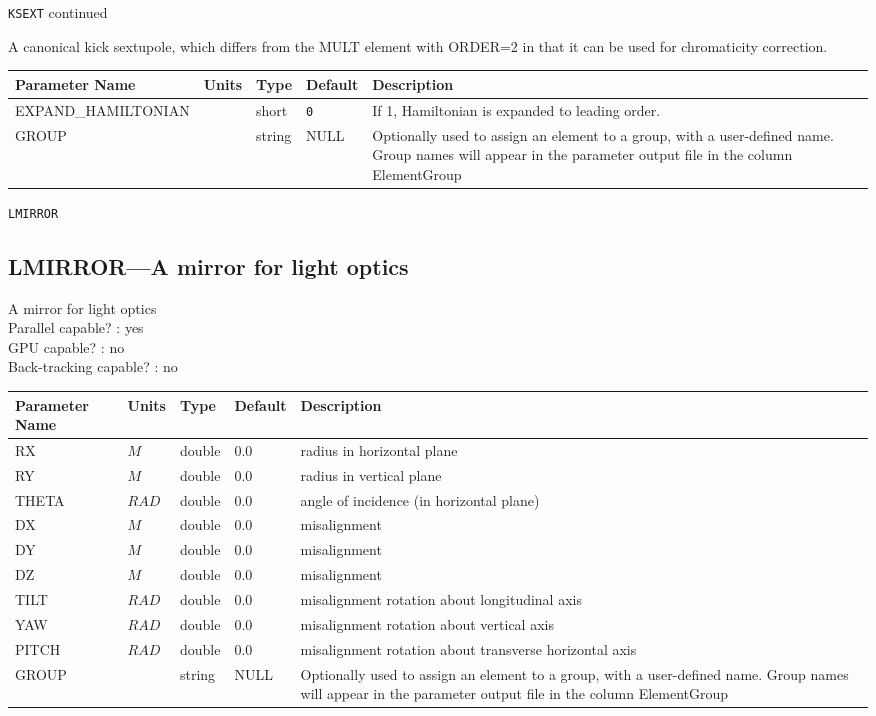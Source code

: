 \newpage
\begin{center}{\Large\verb|KSEXT| continued}\end{center}
A canonical kick sextupole, which differs from the MULT element with ORDER=2 in that it can be used for chromaticity correction.
\\
\begin{tabular}{|l|l|l|l|p{\descwidth}|} \hline
Parameter Name & Units & Type & Default & Description \\ \hline 
EXPAND\_HAMILTONIAN &  & short &  \verb|0| & If 1, Hamiltonian is expanded to leading order.  \\ \hline 
GROUP &  & string & NULL & Optionally used to assign an element to a group, with a user-defined name.  Group names will appear in the parameter output file in the column ElementGroup  \\ \hline 
\end{tabular}

\vspace*{0.5in}

\newpage
\begin{center}{\Large\verb|LMIRROR|}\end{center}
\subsection{LMIRROR---A mirror for light optics}
A mirror for light optics
\\
Parallel capable? : yes\\
GPU capable? : no\\
Back-tracking capable? : no\\
\begin{tabular}{|l|l|l|l|p{\descwidth}|} \hline
Parameter Name & Units & Type & Default & Description \\ \hline 
RX & $M$ & double &  0.0 & radius in horizontal plane  \\ \hline 
RY & $M$ & double &  0.0 & radius in vertical plane  \\ \hline 
THETA & $RAD$ & double &  0.0 & angle of incidence (in horizontal plane)  \\ \hline 
DX & $M$ & double &  0.0 & misalignment  \\ \hline 
DY & $M$ & double &  0.0 & misalignment  \\ \hline 
DZ & $M$ & double &  0.0 & misalignment  \\ \hline 
TILT & $RAD$ & double &  0.0 & misalignment rotation about longitudinal axis  \\ \hline 
YAW & $RAD$ & double &  0.0 & misalignment rotation about vertical axis  \\ \hline 
PITCH & $RAD$ & double &  0.0 & misalignment rotation about transverse horizontal axis  \\ \hline 
GROUP &  & string & NULL & Optionally used to assign an element to a group, with a user-defined name.  Group names will appear in the parameter output file in the column ElementGroup  \\ \hline 
\end{tabular}

